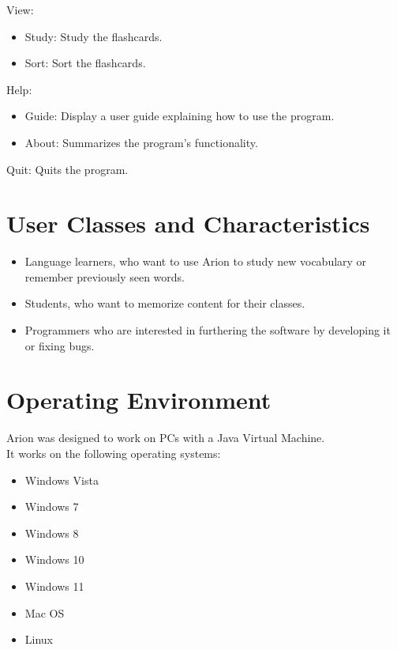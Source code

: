 \documentclass{scrreprt}
\begin{document}
View:
\begin{itemize}
    \item Study: Study the flashcards.
    \item Sort: Sort the flashcards.
\end{itemize}

Help:
\begin{itemize}
    \item Guide: Display a user guide explaining how to use the program.
    \item About: Summarizes the program's functionality.
\end{itemize}

Quit: Quits the program.

\section{User Classes and Characteristics}
\begin{itemize}
    \item Language learners, who want to use Arion to study new vocabulary or remember previously seen words.
    \item Students, who want to memorize content for their classes.
    \item Programmers who are interested in furthering the software by developing it or fixing bugs.
\end{itemize}

\section{Operating Environment}

\begin{flushleft} %
    Arion was designed to work on PCs with a Java Virtual Machine. \\

    It works on the following operating systems: \\
    \begin{itemize}
        \item Windows Vista
        \item Windows 7
        \item Windows 8
        \item Windows 10
        \item Windows 11
        \item Mac OS
        \item Linux
    \end{itemize}
\end{flushleft}
\end{document}
